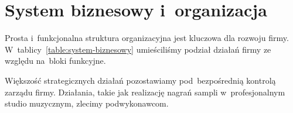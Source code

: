 \documentclass[12pt]{article}
\begin{document}
\section{System biznesowy i~organizacja}


Prosta i~funkcjonalna struktura organizacyjna jest kluczowa dla rozwoju firmy.
W~tablicy~\ref{table:system-biznesowy} umieściliśmy podział działań firmy ze względu na~bloki funkcyjne.

Większość strategicznych działań pozostawiamy pod~bezpośrednią kontrolą zarządu firmy.
Działania, takie jak realizację nagrań sampli w~profesjonalnym studio muzycznym, zlecimy podwykonawcom.
\end{document}
